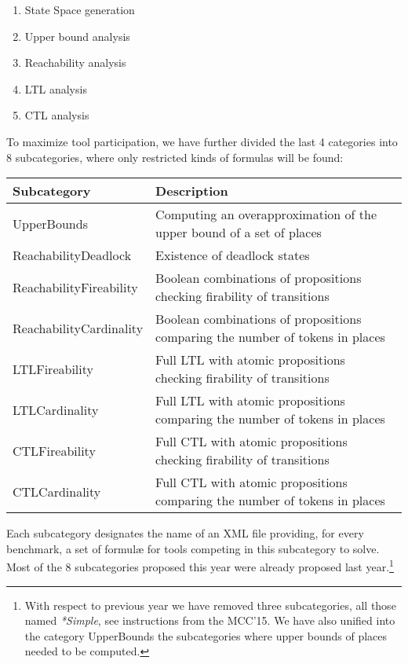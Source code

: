 \documentclass[10pt,english,a4paper]{article}
\makeatletter
\newcommand\ie               {i.e.\@\xspace}
\makeatother
\begin{document}
\begin{enumerate}
\item State Space generation
\item Upper bound analysis
\item Reachability analysis
\item LTL analysis
\item CTL analysis
\end{enumerate}

To maximize tool participation, we have further divided the last 4
categories into 8 subcategories, where only restricted kinds of formulas
will be found:

\begin{center}
\begin{tabular}{ll}
\toprule
Subcategory                       & Description \\
\midrule
UpperBounds                    & Computing an overapproximation of the upper bound of a set of places \\
\midrule
ReachabilityDeadlock           & Existence of deadlock states \\
ReachabilityFireability        & Boolean combinations of propositions checking firability of transitions \\
ReachabilityCardinality        & Boolean combinations of propositions comparing the number of tokens in places\\
\midrule
LTLFireability                 & Full LTL with atomic propositions checking firability of transitions \\
LTLCardinality                 & Full LTL with atomic propositions comparing the number of tokens in places \\
\midrule
CTLFireability                 & Full CTL with atomic propositions checking firability of transitions \\
CTLCardinality                 & Full CTL with atomic propositions comparing the number of tokens in places \\
\bottomrule
\end{tabular}
\end{center}

Each subcategory designates the
name of an XML file providing, for every benchmark, a set of formulæ for
tools competing in this subcategory to solve.
%
Most of the 8 subcategories proposed this year were already proposed last
year.\footnote{With respect to previous year we have removed three
subcategories, all those named \textit{*Simple}, see instructions from the
MCC'15. We have also unified into the category UpperBounds the subcategories
where upper bounds of places needed to be computed.}
\end{document}
